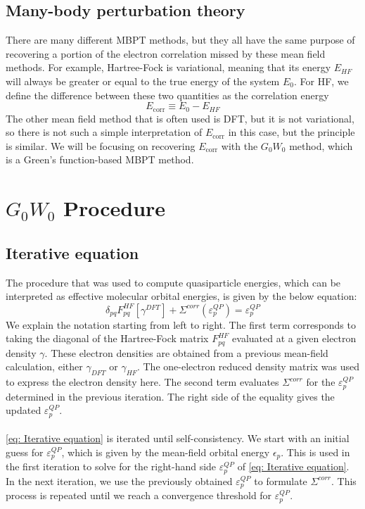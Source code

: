 \documentclass[12pt]{caltech_thesis}
\begin{document}
\section{Many-body perturbation theory}
There are many different MBPT methods, but they all have the same purpose of recovering a portion of the electron correlation missed by these mean field methods. For example, Hartree-Fock is variational, meaning that its energy $E_{HF}$ will always be greater or equal to the true energy of the system $E_0$. For HF, we define the difference between these two quantities as the correlation energy
\begin{equation}
    E_{\text{corr}} \equiv E_0 - E_{HF}
\end{equation}
The other mean field method that is often used is DFT, but it is not variational, so there is not such a simple interpretation of $E_{\text{corr}}$ in this case, but the principle is similar. We will be focusing on recovering $E_{\text{corr}}$ with the $G_0W_0$ method, which is a Green's function-based MBPT method.



\chapter{$G_0W_0$ Procedure}
\section{Iterative equation}
The procedure that was used to compute quasiparticle energies, which can be interpreted as effective molecular orbital energies, is given by the below equation:
\begin{equation}
    \delta_{pq}F_{pq}^{HF}[\gamma^{DFT}] + \Sigma^{corr}(\varepsilon_{p}^{QP}) = \varepsilon_{p}^{QP}
\label{eq: Iterative equation}
\end{equation}
We explain the notation starting from left to right. The first term corresponds to taking the diagonal of the Hartree-Fock matrix $F_{pq}^{HF}$ evaluated at a given electron density $\gamma$. These electron densities are obtained from a previous mean-field calculation, either $\gamma_{DFT}$ or $\gamma_{HF}$. The one-electron reduced density matrix was used to express the electron density here. The second term evaluates $\Sigma^{corr}$ for the $\varepsilon_{p}^{QP}$ determined in the previous iteration. The right side of the equality gives the updated $\varepsilon_{p}^{QP}$.\\\\ \ref{eq: Iterative equation} is iterated until self-consistency. We start with an initial guess for $\varepsilon_{p}^{QP}$, which is given by the mean-field orbital energy $\epsilon_p$. This is used in the first iteration to solve for the right-hand side $\varepsilon_{p}^{QP}$ of \ref{eq: Iterative equation}. In the next iteration, we use the previously obtained $\varepsilon_{p}^{QP}$ to formulate $\Sigma^{corr}$. This process is repeated until we reach a convergence threshold for $\varepsilon_{p}^{QP}$.
\end{document}
